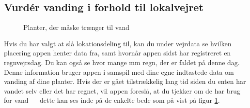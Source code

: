 \subsection{Vurdér vanding i forhold til lokalvejret}
\begin{minipage}{0.4\textwidth}
\begin{figure}[H]
    \centering
    \caption{Planter, der måske trænger til vand}
    \label{plants-to-water}
\end{figure}
\end{minipage} \hfill
\begin{minipage}{0.55\textwidth}
    Hvis du har valgt at slå lokationsdeling til, kan du under vejrdata se hvilken placering appen henter data fra, samt hvornår appen sidst har registreret en regnvejrsdag. Du kan også se hvor mange mm regn, der er faldet på denne dag. Denne information bruger appen i samspil med dine egne indtastede data om vanding af dine planter. Hvis der er gået tilstrækkelig lang tid siden du enten har vandet selv eller det har regnet, vil appen foreslå, at du tjekker om de har brug for vand --- dette kan ses inde på de enkelte bede som på vist på figur \ref{plants-to-water}.
\end{minipage} 
